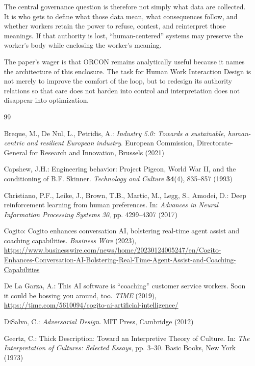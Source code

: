 \documentclass[11pt, a4paper]{article}
\begin{document}
The central governance question is therefore not simply what data are collected. It is who gets to define what those data mean, what consequences follow, and whether workers retain the power to refuse, contest, and reinterpret those meanings. If that authority is lost, ``human-centered'' systems may preserve the worker's body while enclosing the worker's meaning.

The paper's wager is that ORCON remains analytically useful because it names the architecture of this enclosure. The task for Human Work Interaction Design is not merely to improve the comfort of the loop, but to redesign its authority relations so that care does not harden into control and interpretation does not disappear into optimization.

\begin{thebibliography}{99}

Breque, M., De Nul, L., Petridis, A.: \textit{Industry 5.0: Towards a sustainable, human-centric and resilient European industry}. European Commission, Directorate-General for Research and Innovation, Brussels (2021)

Capshew, J.H.: Engineering behavior: Project Pigeon, World War II, and the conditioning of B.F. Skinner. \textit{Technology and Culture} \textbf{34}(4), 835--857 (1993)

Christiano, P.F., Leike, J., Brown, T.B., Martic, M., Legg, S., Amodei, D.: Deep reinforcement learning from human preferences. In: \textit{Advances in Neural Information Processing Systems 30}, pp. 4299--4307 (2017)

Cogito: Cogito enhances conversation AI, bolstering real-time agent assist and coaching capabilities. \textit{Business Wire} (2023), \url{https://www.businesswire.com/news/home/20230124005247/en/Cogito-Enhances-Conversation-AI-Bolstering-Real-Time-Agent-Assist-and-Coaching-Capabilities}

De La Garza, A.: This AI software is ``coaching'' customer service workers. Soon it could be bossing you around, too. \textit{TIME} (2019), \url{https://time.com/5610094/cogito-ai-artificial-intelligence/}

DiSalvo, C.: \textit{Adversarial Design}. MIT Press, Cambridge (2012)

Geertz, C.: Thick Description: Toward an Interpretive Theory of Culture. In: \textit{The Interpretation of Cultures: Selected Essays}, pp. 3--30. Basic Books, New York (1973)


\end{thebibliography}
\end{document}
